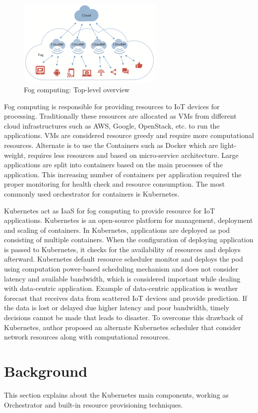 \begin{figure}
  \centering
  \includegraphics[width=70mm]{figures/mlcn-fog-1.pdf}
  \caption{Fog computing: Top-level overview\cite{Bittencourt2017}}
  \label{fig:fog-arch}
\end{figure}
Fog computing is responsible for providing resources to IoT devices for processing. Traditionally these resources are allocated as VMs from different cloud infrastructures such as AWS, Google, OpenStack, etc. to run the applications. VMs are considered resource greedy and require more computational resources. Alternate is to use the Containers such as Docker which are light-weight, requires less resources and based on micro-service architecture. Large applications are split into containers based on the main processes of the application. This increasing number of containers per application required the proper monitoring for health check and resource consumption. The most commonly used orchestrator for containers is Kubernetes. \par
Kubernetes act as IaaS for fog computing to provide resource for IoT applications. Kubernetes is an open-source platform for management, deployment and scaling of containers. In Kubernetes, applications are deployed as pod consisting of multiple containers. When the configuration of deploying application is passed to Kubernetes, it checks for the availability of resources and deploys afterward. Kubernetes default resource scheduler monitor and deploys the pod using computation power-based scheduling mechanism and does not consider latency and available bandwidth, which is considered important while dealing with data-centric application. Example of data-centric application is weather forecast that receives data from scattered IoT devices and provide prediction. If the data is lost or delayed due higher latency and poor bandwidth, timely decisions cannot be made that leads to disaster. To overcome this drawback of Kubernetes, author proposed an alternate Kubernetes scheduler that consider network resources along with computational resources.
\section{Background}
\label{sec:backgroud}
This section explains about the Kubernetes main components, working as Orchestrator and built-in resource provisioning techniques.
